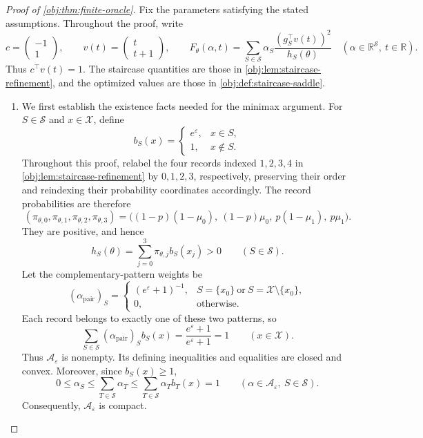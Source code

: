 \begin{proof}[Proof of \cref{obj:thm:finite-oracle}]
Fix the parameters satisfying the stated assumptions. Throughout the proof, write
\[
c=\begin{pmatrix}-1\\1\end{pmatrix},
\qquad
v(t)=\begin{pmatrix}t\\t+1\end{pmatrix},
\qquad
F_\theta(\alpha,t)
=
\sum_{S\in\mathcal S}
\alpha_S\frac{(g_S^\top v(t))^2}{h_S(\theta)}
\quad
(\alpha\in\mathbb R^{\mathcal S},\ t\in\mathbb R).
\]
Thus \(c^\top v(t)=1\). The staircase quantities are those in
\cref{obj:lem:staircase-refinement}, and the optimized values are those in
\cref{obj:def:staircase-saddle}.

\begin{enumerate}
\item We first establish the existence facts needed for the minimax argument.
For \(S\in\mathcal S\) and \(x\in\mathcal X\), define
\[
b_S(x)=
\begin{cases}
e^\varepsilon,&x\in S,\\
1,&x\notin S.
\end{cases}
\]
Throughout this proof, relabel the four records indexed \(1,2,3,4\)
in \cref{obj:lem:staircase-refinement} by \(0,1,2,3\), respectively,
preserving their order and reindexing their probability coordinates
accordingly. The record probabilities are therefore
\[
(\pi_{\theta,0},\pi_{\theta,1},\pi_{\theta,2},\pi_{\theta,3})
=
\bigl(
(1-p)(1-\mu_0),\ (1-p)\mu_0,\
p(1-\mu_1),\ p\mu_1
\bigr).
\]
They are positive, and hence
\[
h_S(\theta)=\sum_{j=0}^3\pi_{\theta,j}b_S(x_j)>0
\qquad(S\in\mathcal S).
\]
Let the complementary-pattern weights be
\[
(\alpha_{\mathrm{pair}})_S=
\begin{cases}
(e^\varepsilon+1)^{-1},
&S=\{x_0\}\ \text{or}\ S=\mathcal X\setminus\{x_0\},\\
0,&\text{otherwise}.
\end{cases}
\]
Each record belongs to exactly one of these two patterns, so
\[
\sum_{S\in\mathcal S}
(\alpha_{\mathrm{pair}})_S b_S(x)
=\frac{e^\varepsilon+1}{e^\varepsilon+1}=1
\qquad(x\in\mathcal X).
\]
Thus \(\mathcal A_\varepsilon\) is nonempty. Its defining inequalities
and equalities are closed and convex. Moreover, since \(b_S(x)\ge1\),
\[
0\le\alpha_S\le\sum_{T\in\mathcal S}\alpha_T
\le\sum_{T\in\mathcal S}\alpha_Tb_T(x)=1
\qquad
(\alpha\in\mathcal A_\varepsilon,\ S\in\mathcal S).
\]
Consequently, \(\mathcal A_\varepsilon\) is compact.


\end{enumerate}
\end{proof}

